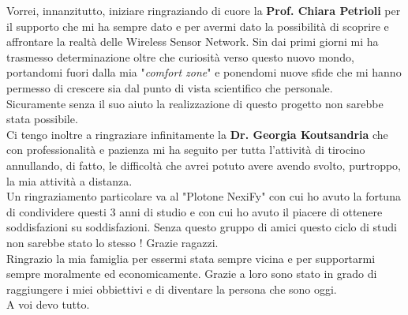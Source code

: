 Vorrei, innanzitutto, iniziare ringraziando di cuore la \textbf{Prof. Chiara Petrioli} per il supporto che mi ha sempre dato e per avermi dato la possibilità di scoprire e affrontare la realtà delle Wireless Sensor Network. Sin dai primi giorni mi ha trasmesso determinazione oltre che curiosità verso questo nuovo mondo, portandomi fuori dalla mia "\textit{comfort zone}" e ponendomi nuove sfide che mi hanno permesso di crescere sia dal punto di vista scientifico che personale.\\
Sicuramente senza il suo aiuto la realizzazione di questo progetto non sarebbe stata possibile.\\

Ci tengo inoltre a ringraziare infinitamente la \textbf{Dr. Georgia Koutsandria} che con professionalità e pazienza mi ha seguito per tutta l'attività di tirocino annullando, di fatto, le difficoltà che avrei potuto avere avendo svolto, purtroppo, la mia attività a distanza.\\

Un ringraziamento particolare va al "Plotone NexiFy" con cui ho avuto la fortuna di condividere questi 3 anni di studio e con cui ho avuto il piacere di ottenere soddisfazioni su soddisfazioni. Senza questo gruppo di amici questo ciclo di studi non sarebbe stato lo stesso ! Grazie ragazzi.\\

Ringrazio la mia famiglia per essermi stata sempre vicina e per supportarmi sempre moralmente ed economicamente. Grazie a loro sono stato in grado di raggiungere i miei obbiettivi e di diventare la persona che sono oggi.\\
A voi devo tutto.